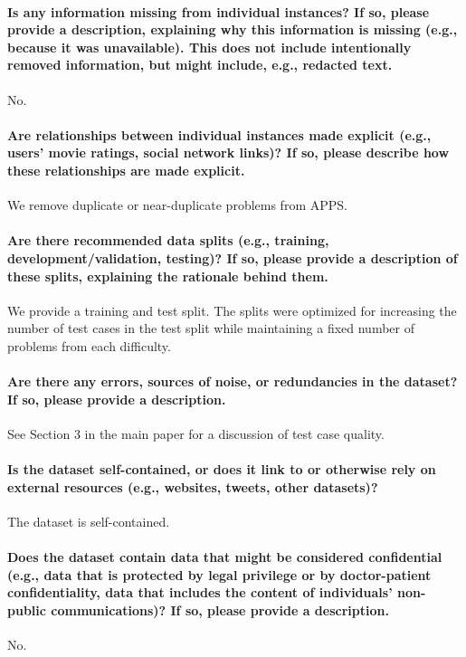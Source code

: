 \documentclass{article}
\begin{document}
\paragraph{Is any information missing from individual instances? If so, please
provide a description, explaining why this information is missing (e.g.,
because it was unavailable). This does not include intentionally removed
information, but might include, e.g., redacted text.}
No.

\paragraph{Are relationships between individual instances made explicit
(e.g., users’ movie ratings, social network links)? If so, please describe how these relationships are made explicit.}
We remove duplicate or near-duplicate problems from APPS.

\paragraph{Are there recommended data splits (e.g., training, development/validation,
testing)? If so, please provide a description of these splits, explaining
the rationale behind them.}
We provide a training and test split. The splits were optimized for increasing the number of test cases in the test split while maintaining a fixed number of problems from each difficulty.

\paragraph{Are there any errors, sources of noise, or redundancies in the
dataset? If so, please provide a description.}
See Section 3 in the main paper for a discussion of test case quality.

\paragraph{Is the dataset self-contained, or does it link to or otherwise rely on
external resources (e.g., websites, tweets, other datasets)?}
The dataset is self-contained.

\paragraph{Does the dataset contain data that might be considered confidential (e.g., data that is protected by legal privilege or by doctor-patient confidentiality, data that includes the content of individuals’ non-public communications)? If so, please provide a description.}
No.
\end{document}
